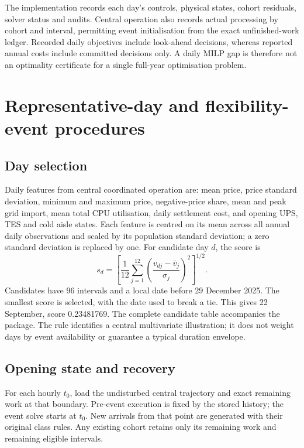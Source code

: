 The implementation records each day's controls, physical states, cohort residuals, solver status and audits. Central operation also records actual processing by cohort and interval, permitting event initialisation from the exact unfinished-work ledger. Recorded daily objectives include look-ahead decisions, whereas reported annual costs include committed decisions only. A daily MILP gap is therefore not an optimality certificate for a single full-year optimisation problem.

\section{Representative-day and flexibility-event procedures}
\subsection{Day selection}
Daily features from central coordinated operation are: mean price, price standard deviation, minimum and maximum price, negative-price share, mean and peak grid import, mean total CPU utilisation, daily settlement cost, and opening UPS, TES and \textcolor{LatestGreen}{cold aisle} states. Each feature is centred on its mean across all annual daily observations and scaled by its population standard deviation; a zero standard deviation is replaced by one. For candidate day $d$, the score is
\begin{equation}
s_d=\left[\frac{1}{12}\sum_{j=1}^{12}
\left(\frac{v_{dj}-\bar v_j}{\sigma_j}\right)^2\right]^{1/2}.
\end{equation}
Candidates have 96 intervals \textcolor{LatestGreen}{and a local date before} 29 December 2025. The smallest score is selected, \textcolor{LatestGreen}{with the date used to break a tie}. This gives 22 September, score 0.23481769. The complete candidate table accompanies the package. The rule identifies a central multivariate illustration; it does not weight days by \textcolor{LatestGreen}{event availability or guarantee} a typical duration envelope.

\subsection{Opening state and recovery}
For each hourly $t_0$, load the undisturbed central trajectory and exact remaining work at that boundary. Pre-event execution is fixed by the stored history; the event solve starts at $t_0$. New arrivals from that point are generated with their original class rules. Any existing cohort retains only its remaining work and remaining eligible intervals.

